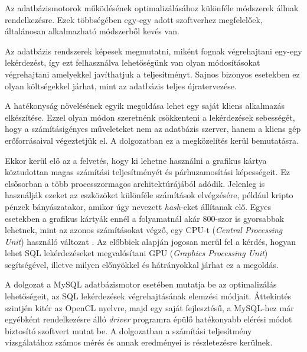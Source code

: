 
Az adatbázismotorok működésének optimalizálásához különféle módszerek állnak rendelkezésre. Ezek többségében egy-egy adott szoftverhez megfelelőek, általánosan alkalmazható módszerből kevés van.

Az adatbázis rendszerek képesek megmutatni, miként fognak végrehajtani egy-egy lekérdezést, így ezt felhasználva lehetőségünk van olyan módosításokat végrehajtani amelyekkel javíthatjuk a teljesítményt. Sajnos bizonyos esetekben ez olyan költségekkel járhat, mint az adatbázis teljes újratervezése.

A hatékonyság növelésének egyik megoldása lehet egy saját kliens alkalmazás elkészítése. Ezzel olyan módon szeretnénk csökkenteni a lekérdezések sebességét, hogy a számításigényes műveleteket nem az adatbázis szerver, hanem a kliens gép erőforrásaival végeztetjük el. A dolgozatban ez a megközelítés kerül bemutatásra.

Ekkor kerül elő az a felvetés, hogy ki lehetne használni a grafikus kártya köztudottan magas számítási teljesítményét és párhuzamosítási képességeit. Ez elsősorban a több processzormagos architektúrájából adódik. Jelenleg is használják ezeket az eszközöket különféle számítások elvégzésére, például kripto pénzek bányászatakor, amikor úgy nevezett \textit{hash}-eket állítanak elő. Egyes esetekben a grafikus kártyák ennél a folyamatnál akár 800-szor is gyorsabbak lehetnek, mint az azonos számításokat végző, egy CPU-t (\textit{Central Processing Unit}) használó változat \cite{crypto}. Az előbbiek alapján jogosan merül fel a kérdés, hogyan lehet SQL lekérdezéseket megvalósítani GPU (\textit{Graphics Processing Unit}) segítségével, illetve milyen előnyökkel és hátrányokkal járhat ez a megoldás.

A dolgozat a MySQL adatbázismotor esetében mutatja be az optimalizálás lehetőségeit, az SQL lekérdezések végrehajtásának elemzési módjait. Áttekintés szintjén kitér az OpenCL nyelvre, majd egy saját fejlesztésű, a MySQL-hez már egyébként rendelkezésre álló \textit{driver} programra épülő hatékonyabb elérési módot biztosító szoftvert mutat be. A dolgozatban a számítási teljesítmény vizsgálatához számos mérés és annak eredményei is részletezésre kerülnek.









